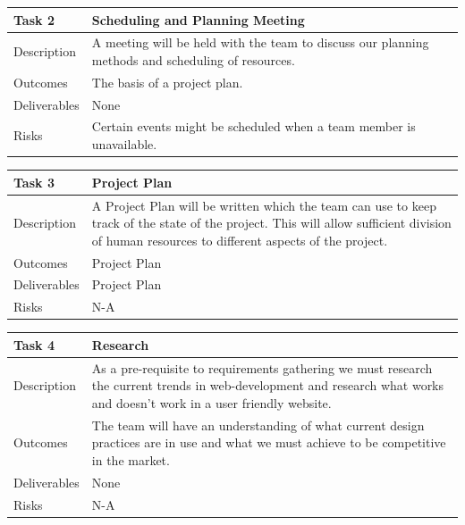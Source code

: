 \documentclass{l3proj}
\begin{document}
\begin{center}
    \begin{tabular}{ | l | p{12cm} |}
    \hline	
    Task 2 & Scheduling and Planning Meeting \\ \hline
    Description & A meeting will be held with the team to discuss our planning methods and scheduling of resources. \\ \hline   
    Outcomes & The basis of a project plan. \\ \hline
    Deliverables & None \\ \hline
    Risks & Certain events might be scheduled when a team member is unavailable. \\ 
    \hline
    \end{tabular}
\end{center}

\begin{center}
    \begin{tabular}{ | l | p{12cm} |}
    \hline	
    Task 3 & Project Plan \\ \hline
    Description & A Project Plan will be written which the team can use to keep track of the state of the project. This will allow sufficient division of human resources to different aspects of the project. \\ \hline   
    Outcomes & Project Plan \\ \hline
    Deliverables & Project Plan \\ \hline
    Risks & N-A \\ 
    \hline
    \end{tabular}
\end{center}

\begin{center}
    \begin{tabular}{ | l | p{12cm} |}
    \hline	
    Task 4 & Research \\ \hline
    Description & As a pre-requisite to requirements gathering we must research the current trends in web-development and research what works and doesn't work in a user friendly website. \\ \hline   
    Outcomes & The team will have an understanding of what current design practices are in use and what we must achieve to be competitive in the market. \\ \hline
    Deliverables & None \\ \hline
    Risks & N-A \\ 
    \hline
    \end{tabular}
\end{center}
\end{document}
